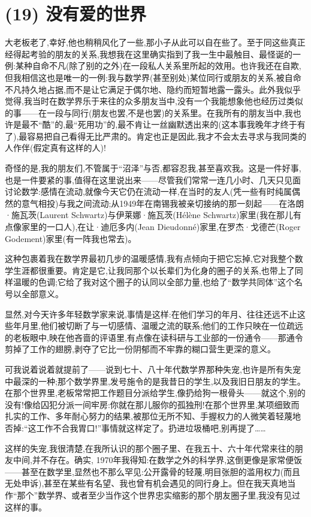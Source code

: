 \section{(19) 没有爱的世界}

大老板老了,幸好,他也稍稍风化了一些,那小子从此可以自在些了。至于同这些真正经得起考验的朋友的关系,我想我在这里确实指到了我一生中最触目、最怪诞的一例:某种自命不凡(除了别的之外)在一段私人关系里所起的效用。也许我还在自欺,但我相信这也是唯一的一例:我与数学界(甚至别处)某位同行或朋友的关系,被自命不凡持久地占据,而不是让它满足于偶尔地、隐约而短暂地露一露头。此外我似乎觉得,我当时在数学界乐于来往的众多朋友当中,没有一个我能想象他也经历过类似的事——在一段与同行(朋友也罢,不是也罢)的关系里。在我所有的朋友当中,我也许是最不“酷”的,最“死用功”的,最不肯让一丝幽默透出来的(这本事我晚年才终于有了),最容易把自己看得无比严肃的。肯定也正是因此,我才不会太去寻求与我同类的人作伴(假定真有这样的人)!

奇怪的是,我的朋友们,不管属于“沼泽”与否,都容忍我,甚至喜欢我。这是一件好事,也是一件要紧的事,值得在这里说出来——尽管我们常常一连几小时、几天只见面讨论数学:感情在流动,就像今天它仍在流动一样,在当时的友人(凭一些有时纯属偶然的意气相投)与我之间流动;从1949年在南锡我被亲切接纳的那一刻起——在洛朗·施瓦茨(Laurent Schwartz)与伊莱娜·施瓦茨(Hélène Schwartz)家里(我在那儿有点像家里的一口人),在让·迪厄多内(Jean Dieudonné)家里,在罗杰·戈德芒(Roger Godement)家里(有一阵我也常去)。

这种包裹着我在数学界最初几步的温暖感情,我有点倾向于把它忘掉,它对我整个数学生涯都很重要。肯定是它,让我同那个以长辈们为化身的圈子的关系,也带上了同样温暖的色调;它给了我对这个圈子的认同以全部力量,也给了“数学共同体”这个名号以全部意义。

显然,对今天许多年轻数学家来说,事情是这样:在他们学习的年月、往往还远不止这些年月里,他们被切断了与一切感情、温暖之流的联系;他们的工作只映在一位疏远的老板眼中,映在他吝啬的评语里,有点像在读科研与工业部的一份通令——那通令剪掉了工作的翅膀,剥夺了它比一份阴郁而不牢靠的糊口营生更深的意义。

可我说着说着就提前了——说到七十、八十年代数学界那种失宠,也许是所有失宠中最深的一种;那个数学界里,发号施令的是我昔日的学生,以及我旧日朋友的学生。在那个世界里,老板常常把工作题目分派给学生,像扔给狗一根骨头——就这个,别的没有!像给囚犯分派一间牢房:你就在那儿服你的孤独刑!在那个世界里,某项细致而扎实的工作、多年耐心努力的结果,被那位无所不知、手握权力的人微笑着轻蔑地否掉:“这工作不合我胃口!”事情就这样定了。扔进垃圾桶吧,别再提了……

这样的失宠,我很清楚,在我所认识的那个圈子里、在我五十、六十年代常来往的朋友中间,并不存在。确实, 1970年我得知:在数学之外的科学界,这倒更像是家常便饭——甚至在数学里,显然也不那么罕见:公开露骨的轻蔑,明目张胆的滥用权力(而且无处申诉),甚至在某些有名望、我也曾有机会遇见的同行身上。但在我天真地当作“那个”数学界、或者至少当作这个世界忠实缩影的那个朋友圈子里,我没有见过这样的事。

